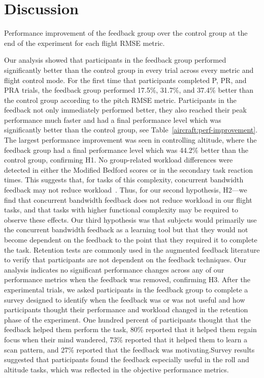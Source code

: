 \section{Discussion}

\begin{table}[tb]
    \centering
    \caption[Performance improvement of the feedback group over the control group]{Performance improvement of the feedback group over the control group at the end of the experiment for each flight RMSE metric.}
    \label{aircraft:perf-improvement}
\end{table}

Our analysis showed that participants in the feedback group performed significantly better than the control group in every trial across every metric and flight control mode.
For the first time that participants completed P, PR, and PRA trials, the feedback group performed 17.5\%, 31.7\%, and 37.4\% better than the control group according to the pitch RMSE metric.
Participants in the feedback not only immediately performed better, they also reached their peak performance much faster and had a final performance level which was significantly better than the control group, see Table~\ref{aircraft:perf-improvement}.
The largest performance improvement was seen in controlling altitude, where the feedback group had a final performance level which was 44.2\% better than the control group, confirming H1.
No group-related workload differences were detected in either the Modified Bedford scores or in the secondary task reaction times.
This suggests that, for tasks of this complexity, concurrent bandwidth feedback may not reduce workload~\citep{karasinski_evaluating_2019}.
Thus, for our second hypothesis, H2---we find that concurrent bandwidth feedback does not reduce workload in our flight tasks, and that tasks with higher functional complexity may be required to observe these effects.
Our third hypothesis was that subjects would primarily use the concurrent bandwidth feedback as a learning tool but that they would not become dependent on the feedback to the point that they required it to complete the task.
Retention tests are commonly used in the augmented feedback literature to verify that participants are not dependent on the feedback techniques.
Our analysis indicates no significant performance changes across any of our performance metrics when the feedback was removed, confirming H3.
After the experimental trials, we asked participants in the feedback group to complete a survey designed to identify when the feedback was or was not useful and how participants thought their performance and workload changed in the retention phase of the experiment.
One hundred percent of participants thought that the feedback helped them perform the task, 80\% reported that it helped them regain focus when their mind wandered, 73\% reported that it helped them to learn a scan pattern, and 27\% reported that the feedback was motivating.Survey results suggested that participants found the feedback especially useful in the roll and altitude tasks, which was reflected in the objective performance metrics.

